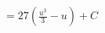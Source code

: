 \documentclass[preview]{standalone}
\begin{document}
\begin{align*}
&=27(\frac{u^3}{3}-u)+C
\end{align*}
\end{document}
